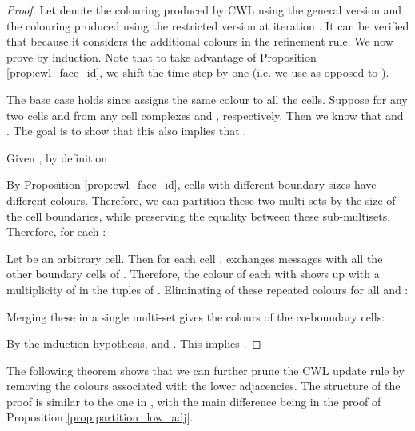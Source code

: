 \documentclass{article}
\begin{document}
\begin{proof}
Let  denote the colouring produced by CWL using the general version and  the colouring produced using the restricted version at iteration . It can be verified that  because it considers the additional  colours in the refinement rule. We  now prove  by induction. Note that to take advantage of Proposition \ref{prop:cwl_face_id}, we shift the time-step by one (i.e. we use  as opposed to ). 

The base case holds since  assigns the same colour to all the cells. Suppose  for any two cells  and  from any cell complexes  and , respectively. Then we know that  and . The goal is to show that this also implies that .

Given , by definition 
 
By Proposition \ref{prop:cwl_face_id}, cells with different boundary sizes have different colours. Therefore, we can partition these two multi-sets by the size of the cell boundaries, while preserving the equality between these sub-multisets. Therefore, for each :  

Let  be an arbitrary cell. Then for each cell ,  exchanges messages with all the other boundary cells of . Therefore, the colour of each  with  shows up with a multiplicity of  in the tuples of . Eliminating  of these repeated colours for all  and : 

Merging these in a single multi-set gives the colours of the co-boundary cells:

By the induction hypothesis,  and . This implies . 
\end{proof}

The following theorem shows that we can further prune the CWL update rule by removing the colours associated with the lower adjacencies. The structure of the proof is similar to the one in \citet{bodnar2021weisfeiler}, with the main difference being in the proof of Proposition \ref{prop:partition_low_adj}. 
\end{document}
